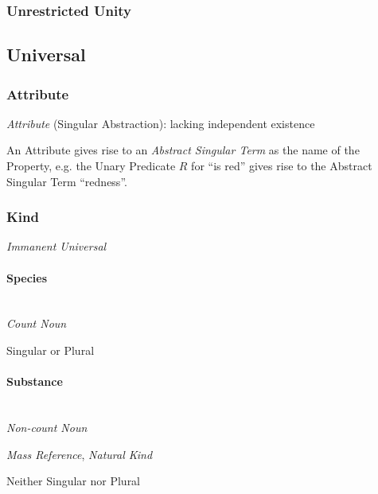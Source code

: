 \subsubsection{Unrestricted Unity}\label{sec:unrestricted_unity}



\subsection{Universal}\label{sec:universal}

\subsubsection{Attribute}\label{sec:attribute}

\emph{Attribute} (Singular Abstraction): lacking independent existence

An Attribute gives rise to an \emph{Abstract Singular Term} as the name
of the Property, e.g. the Unary Predicate $R$ for ``is red'' gives
rise to the Abstract Singular Term ``redness''. \cite{laycock10}



\subsubsection{Kind}\label{sec:universal_kind}

\emph{Immanent Universal}



\paragraph{Species}\label{sec:species}
\hfill \\

\emph{Count Noun}

Singular or Plural



\paragraph{Substance}\label{sec:substance}
\hfill \\

\emph{Non-count Noun}

\emph{Mass Reference}, \emph{Natural Kind}

Neither Singular nor Plural



